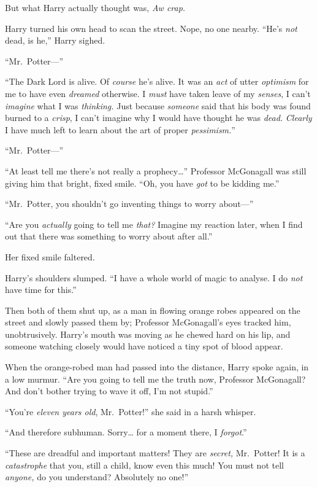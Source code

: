But what Harry actually thought was, \emph{Aw crap.}

Harry turned his own head to scan the street. Nope, no one nearby.
``He's \emph{not} dead, is he,'' Harry sighed.

``Mr.~Potter---''

``The Dark Lord is alive. Of \emph{course} he's alive. It was an
\emph{act} of utter \emph{optimism} for me to have even \emph{dreamed}
otherwise. I \emph{must} have taken leave of my \emph{senses}, I can't
\emph{imagine} what I was \emph{thinking.} Just because \emph{someone}
said that his body was found burned to a \emph{crisp}, I can't imagine
why I would have thought he was \emph{dead.} \emph{Clearly} I have much
left to learn about the art of proper \emph{pessimism.}''

``Mr.~Potter---''

``At least tell me there's not really a prophecy\ldots{}'' Professor
McGonagall was still giving him that bright, fixed smile. ``Oh, you have
\emph{got} to be kidding me.''

``Mr.~Potter, you shouldn't go inventing things to worry about---''

``Are you \emph{actually} going to tell me \emph{that?} Imagine my
reaction later, when I find out that there was something to worry about
after all.''

Her fixed smile faltered.

Harry's shoulders slumped. ``I have a whole world of magic to analyse. I
do \emph{not} have time for this.''

Then both of them shut up, as a man in flowing orange robes appeared on
the street and slowly passed them by; Professor McGonagall's eyes
tracked him, unobtrusively. Harry's mouth was moving as he chewed hard
on his lip, and someone watching closely would have noticed a tiny spot
of blood appear.

When the orange-robed man had passed into the distance, Harry spoke
again, in a low murmur. ``Are you going to tell me the truth now,
Professor McGonagall? And don't bother trying to wave it off, I'm not
stupid.''

``You're \emph{eleven years old}, Mr.~Potter!'' she said in a harsh
whisper.

``And therefore subhuman. Sorry\ldots{} for a moment there, I
\emph{forgot}.''

``These are dreadful and important matters! They are \emph{secret,}
Mr.~Potter! It is a \emph{catastrophe} that you, still a child, know
even this much! You must not tell \emph{anyone,} do you understand?
Absolutely no one!''

